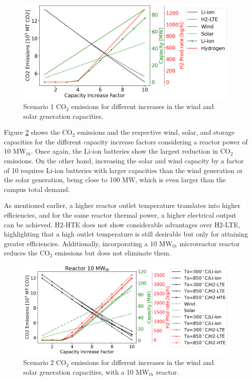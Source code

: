 \documentclass{anstrans}
\begin{document}
\begin{figure}[htbp!] %
    \centering
    \includegraphics[width=0.99\linewidth]{figures/scenario1-summerA}
    \hfill
    \caption{Scenario 1 CO$_2$ emissions for different increases in the wind and solar generation capacities.}
    \label{fig:1-summer-emissions}
\end{figure}

Figure \ref{fig:2-summer-10-emissions} shows the CO$_2$ emissions and the respective wind, solar, and storage capacities for the different capacity increase factors considering a reactor power of 10 MW$_{th}$.
Once again, the Li-ion batteries show the largest reduction in CO$_2$ emissions.
On the other hand, increasing the solar and wind capacity by a factor of 10 requires Li-ion batteries with larger capacities than the wind generation or the solar generation, being close to 100 MW, which is even larger than the campus total demand.

As mentioned earlier, a higher reactor outlet temperature translates into higher efficiencies, and for the same reactor thermal power, a higher electrical output can be achieved.
H2-HTE does not show considerable advantages over H2-LTE, highlighting that a high outlet temperature is still desirable but only for attaining greater efficiencies.
Additionally, incorporating a 10 MW$_{th}$ microreactor reactor reduces the CO$_2$ emissions but does not eliminate them.

\begin{figure}[htbp!] %
    \centering
    \includegraphics[width=0.99\linewidth]{figures/scenario2-10-summer-emissions}
    \hfill
    \caption{Scenario 2 CO$_2$ emissions for different increases in the wind and solar generation capacities, with a 10 MW$_{th}$ reactor.}
    \label{fig:2-summer-10-emissions}
\end{figure}
\end{document}
